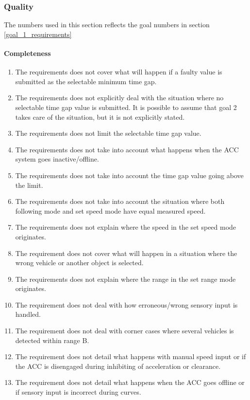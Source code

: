 \newpage
\subsubsection{Quality}

The numbers used in this section reflects the goal numbers in section \ref{goal_1_requirements}

\paragraph{Completeness}

\begin{enumerate}
    \item The requirements does not cover what will happen if a faulty value is submitted as the selectable minimum time gap.
    \item The requirements does not explicitly deal with the situation where no selectable time gap value is submitted. It is possible to assume that goal 2 takes care of the situation, but it is not explicitly stated.
    \item The requirements does not limit the selectable time gap value.
    \item The requirements does not take into account what happens when the ACC system goes inactive/offline.
    \item The requirements does not take into account the time gap value going above the limit. 
    \item The requirements does not take into account the situation where both following mode and set speed mode have equal measured speed.
    \item The requirements does not explain where the speed in the set speed mode originates.
    \item The requirement does not cover what will happen in a situation where the wrong vehicle or another object is selected.
    \item The requirements does not explain where the range in the set range mode originates.
    \item The requirement does not deal with how erroneous/wrong sensory input is handled.
    \item The requirement does not deal with corner cases where several vehicles is detected within range B.
    \item The requirement does not detail what happens with manual speed input or if the ACC is disengaged during inhibiting of acceleration or clearance.
    \item The requirement does not detail what happens when the ACC goes offline or if sensory input is incorrect during curves.
    
\end{enumerate}

